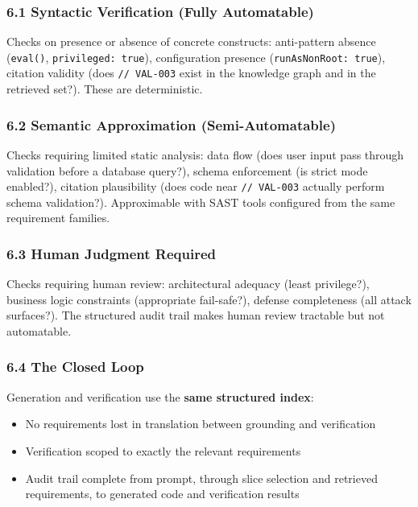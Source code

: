 \documentclass[
]{article}
\providecommand{\tightlist}{%
  \setlength{\itemsep}{0pt}\setlength{\parskip}{0pt}}
\begin{document}
\subsubsection{6.1 Syntactic Verification (Fully
Automatable)}\label{syntactic-verification-fully-automatable}

Checks on presence or absence of concrete constructs: anti-pattern
absence (\texttt{eval()}, \texttt{privileged:\ true}), configuration
presence (\texttt{runAsNonRoot:\ true}), citation validity (does
\texttt{//\ VAL-003} exist in the knowledge graph and in the retrieved
set?). These are deterministic.

\subsubsection{6.2 Semantic Approximation
(Semi-Automatable)}\label{semantic-approximation-semi-automatable}

Checks requiring limited static analysis: data flow (does user input
pass through validation before a database query?), schema enforcement
(is strict mode enabled?), citation plausibility (does code near
\texttt{//\ VAL-003} actually perform schema validation?). Approximable
with SAST tools configured from the same requirement families.

\subsubsection{6.3 Human Judgment
Required}\label{human-judgment-required}

Checks requiring human review: architectural adequacy (least
privilege?), business logic constraints (appropriate fail-safe?),
defense completeness (all attack surfaces?). The structured audit trail
makes human review tractable but not automatable.

\subsubsection{6.4 The Closed Loop}\label{the-closed-loop}

Generation and verification use the \textbf{same structured index}:

\begin{itemize}
\tightlist
\item
  No requirements lost in translation between grounding and verification
\item
  Verification scoped to exactly the relevant requirements
\item
  Audit trail complete from prompt, through slice selection and
  retrieved requirements, to generated code and verification results
\end{itemize}
\end{document}
